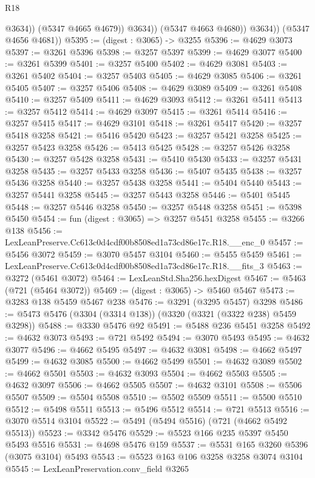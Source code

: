 \begin{lexlean}{R18}
\begin{coremodule}
                      @3634))
                  (@5347 @4665 @4679))
                @3634))
            (@5347 @4663 @4680))
          @3634))
      (@5347 @4656 @4681))
@5395 := (digest : @3065) -> @3255
@5396 := @4629 @3073
@5397 := @3261 @5396
@5398 := @3257 @5397
@5399 := @4629 @3077
@5400 := @3261 @5399
@5401 := @3257 @5400
@5402 := @4629 @3081
@5403 := @3261 @5402
@5404 := @3257 @5403
@5405 := @4629 @3085
@5406 := @3261 @5405
@5407 := @3257 @5406
@5408 := @4629 @3089
@5409 := @3261 @5408
@5410 := @3257 @5409
@5411 := @4629 @3093
@5412 := @3261 @5411
@5413 := @3257 @5412
@5414 := @4629 @3097
@5415 := @3261 @5414
@5416 := @3257 @5415
@5417 := @4629 @3101
@5418 := @3261 @5417
@5420 := @3257 @5418 @3258
@5421 := @5416 @5420
@5423 := @3257 @5421 @3258
@5425 := @3257 @5423 @3258
@5426 := @5413 @5425
@5428 := @3257 @5426 @3258
@5430 := @3257 @5428 @3258
@5431 := @5410 @5430
@5433 := @3257 @5431 @3258
@5435 := @3257 @5433 @3258
@5436 := @5407 @5435
@5438 := @3257 @5436 @3258
@5440 := @3257 @5438 @3258
@5441 := @5404 @5440
@5443 := @3257 @5441 @3258
@5445 := @3257 @5443 @3258
@5446 := @5401 @5445
@5448 := @3257 @5446 @3258
@5450 := @3257 @5448 @3258
@5451 := @5398 @5450
@5454 := fun (digest : @3065) => @3257 @5451 @3258
@5455 := @3266 @138
@5456 := LexLeanPreserve.Cc613c0d4cdf00b8508ed1a73cd86e17c.R18.__enc_0
@5457 := @5456 @3072
@5459 := @3070 @5457 @3104
@5460 := @5455 @5459
@5461 := LexLeanPreserve.Cc613c0d4cdf00b8508ed1a73cd86e17c.R18.__fits_3
@5463 := @3272 (@5461 @3072)
@5464 := LexLeanStd.Sha256.hexDigest
@5467 := @5463 (@721 (@5464 @3072))
@5469 := (digest : @3065) -> @5460 @5467
@5473 := @3283 @138 @5459 @5467 @238
@5476 := @3291 (@3295 @5457) @3298
@5486 := @5473 @5476 (@3304 (@3314 @138)) (@3320 (@3321 (@3322 @238) @5459 @3298))
@5488 := @3330 @5476 @92
@5491 := @5488 @236 @5451 @3258
@5492 := @4632 @3073
@5493 := @721 @5492
@5494 := @3070 @5493
@5495 := @4632 @3077
@5496 := @4662 @5495
@5497 := @4632 @3081
@5498 := @4662 @5497
@5499 := @4632 @3085
@5500 := @4662 @5499
@5501 := @4632 @3089
@5502 := @4662 @5501
@5503 := @4632 @3093
@5504 := @4662 @5503
@5505 := @4632 @3097
@5506 := @4662 @5505
@5507 := @4632 @3101
@5508 := @5506 @5507
@5509 := @5504 @5508
@5510 := @5502 @5509
@5511 := @5500 @5510
@5512 := @5498 @5511
@5513 := @5496 @5512
@5514 := @721 @5513
@5516 := @3070 @5514 @3104
@5522 := @5491 (@5494 @5516) (@721 (@4662 @5492 @5513))
@5523 := @3342 @5476
@5529 := @5523 @166 @235 @5397 @5450 @5493 @5516
@5531 := @4698 @5476 @159
@5537 := @5531 @165 @3260 @5396 (@3075 @3104) @5493
@5543 := @5523 @163 @106 @3258 @3258 @3074 @3104
@5545 := LexLeanPreservation.conv_field @3265

\end{coremodule}
\end{lexlean}
